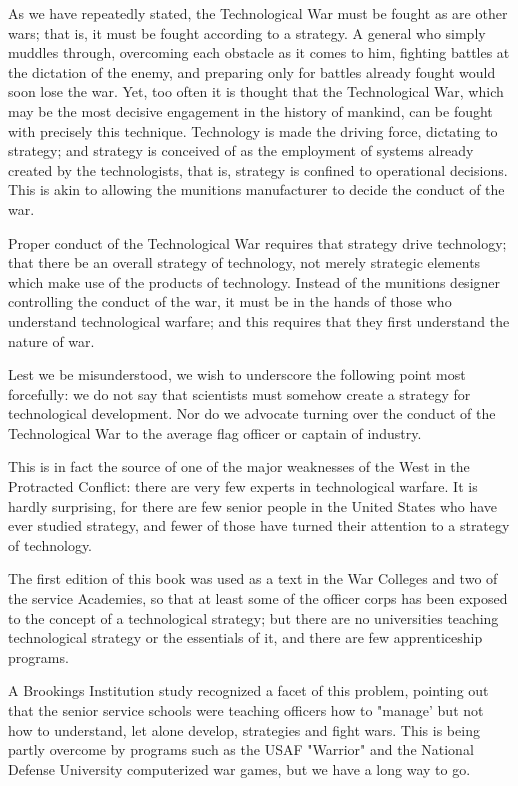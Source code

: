 As we have repeatedly stated, the Technological War must be fought as are other wars; that is, it must be fought according to a strategy. A general who simply muddles through, overcoming each obstacle as it comes to him, fighting battles at the dictation of the enemy, and preparing only for battles already fought would soon lose the war. Yet, too often it is thought that the Technological War, which may be the most decisive engagement in the history of mankind, can be fought with precisely this technique. Technology is made the driving force, dictating to strategy; and strategy is conceived of as the employment of systems already created by the technologists, that is, strategy is confined to operational decisions. This is akin to allowing the munitions manufacturer to decide the conduct of the war.

Proper conduct of the Technological War requires that strategy drive technology; that there be an overall strategy of technology, not merely strategic elements which make use of the products of technology. Instead of the munitions designer controlling the conduct of the war, it must be in the hands of those who understand technological warfare; and this requires that they first understand the nature of war.

Lest we be misunderstood, we wish to underscore the following point most forcefully: we do not say that scientists must somehow create a strategy for technological development. Nor do we advocate turning over the conduct of the Technological War to the average flag officer or captain of industry.

This is in fact the source of one of the major weaknesses of the West in the Protracted Conflict: there are very few experts in technological warfare. It is hardly surprising, for there are few senior people in the United States who have ever studied strategy, and fewer of those have turned their attention to a strategy of technology.

The first edition of this book was used as a text in the War Colleges and two of the service Academies, so that at least some of the officer corps has been exposed to the concept of a technological strategy; but there are no universities teaching technological strategy or the essentials of it, and there are few apprenticeship programs.

A Brookings Institution study recognized a facet of this problem, pointing out that the senior service schools were teaching officers how to "manage' but not how to understand, let alone develop, strategies and fight wars. This is being partly overcome by programs such as the USAF "Warrior" and the National Defense University computerized war games, but we have a long way to go.

